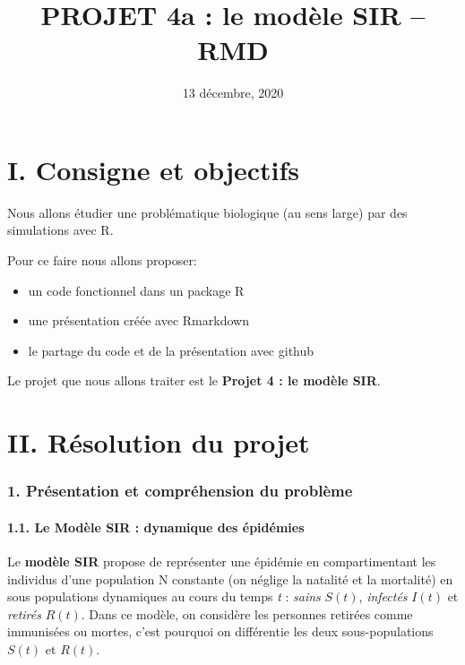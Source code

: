 \documentclass[
]{article}
\title{PROJET 4a : le modèle SIR -- RMD}
\author{}
\date{\vspace{-2.5em}13 décembre, 2020}
\begin{document}
\maketitle

\hypertarget{i.-consigne-et-objectifs}{%
\section{I. Consigne et objectifs}\label{i.-consigne-et-objectifs}}

Nous allons étudier une problématique biologique (au sens large) par des
simulations avec R.

Pour ce faire nous allons proposer:

\begin{itemize}
\item
  un code fonctionnel dans un package R
\item
  une présentation créée avec Rmarkdown
\item
  le partage du code et de la présentation avec github
\end{itemize}

Le projet que nous allons traiter est le \textbf{Projet 4 : le modèle
SIR}.

\hypertarget{ii.-ruxe9solution-du-projet}{%
\section{II. Résolution du projet}\label{ii.-ruxe9solution-du-projet}}

\hypertarget{pruxe9sentation-et-compruxe9hension-du-probluxe8me}{%
\subsubsection{1. Présentation et compréhension du
problème}\label{pruxe9sentation-et-compruxe9hension-du-probluxe8me}}

\hypertarget{le-moduxe8le-sir-dynamique-des-uxe9piduxe9mies}{%
\paragraph{1.1. Le Modèle SIR : dynamique des
épidémies}\label{le-moduxe8le-sir-dynamique-des-uxe9piduxe9mies}}

Le \textbf{modèle SIR} propose de représenter une épidémie en
compartimentant les individus d'une population N constante (on néglige
la natalité et la mortalité) en sous populations dynamiques au cours du
temps \emph{t} : \emph{sains} \textbf{\(S(t)\)}, \emph{infectés}
\textbf{\(I(t)\)} et \emph{retirés} \textbf{\(R(t)\)}. Dans ce modèle,
on considère les personnes retirées comme immunisées ou mortes, c'est
pourquoi on différentie les deux sous-populations \(S(t)\) et \(R(t)\).
\end{document}
